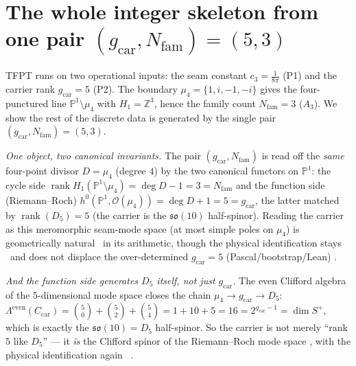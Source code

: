\documentclass[11pt,a4paper]{article}
\newcommand{\cthree}{c_3}
\newcommand{\gcar}{g_{\mathrm{car}}}
\newcommand{\Nfam}{N_{\mathrm{fam}}}
\newcommand{\Z}{\mathbb Z}
\newcommand{\PP}{\mathbb P}
\begin{document}
\section{The whole integer skeleton from one pair $(\gcar,\Nfam)=(5,3)$}\label{sec:core}
TFPT runs on two operational inputs: the seam constant $\cthree=\tfrac1{8\pi}$ (P1) and the carrier rank
$\gcar=5$ (P2). The boundary $\mu_4=\{1,i,-1,-i\}$ gives the four-punctured line $\mathbb P^1\setminus\mu_4$
with $H_1=\Z^3$, hence the family count $\Nfam=3$ ($A_3$). We show the rest of the discrete data is
generated by the single pair $(\gcar,\Nfam)=(5,3)$.
\par\smallskip
\noindent\emph{One object, two canonical invariants.} The pair $(\gcar,\Nfam)$ is read off the
\emph{same} four-point divisor $D=\mu_4$ (degree $4$) by the two canonical functors on $\PP^1$: the cycle
side $\operatorname{rank}H_1(\PP^1\setminus\mu_4)=\deg D-1=3=\Nfam$ and the function side (Riemann--Roch)
$h^0(\PP^1,\mathcal O(\mu_4))=\deg D+1=5=\gcar$, the latter matched by $\operatorname{rank}(D_5)=5$ (the
carrier is the $\mathfrak{so}(10)$ half-spinor). Reading the carrier as this meromorphic seam-mode space
(at most simple poles on $\mu_4$) is geometrically natural \mE\ in its arithmetic, though the physical
identification stays \mC\ and does not displace the over-determined $\gcar=5$ (Pascal/bootstrap/Lean)
.
\par\smallskip
\noindent\emph{And the function side generates $D_5$ itself, not just $\gcar$.} The even Clifford algebra of
the $5$-dimensional mode space closes the chain $\mu_4\to\gcar\to D_5$: $\Lambda^{\mathrm{even}}(C_{\mathrm{car}})
=\binom50+\binom52+\binom54=1+10+5=16=2^{\gcar-1}=\dim S^+$, which is exactly the $\mathfrak{so}(10)=D_5$
half-spinor. So the carrier is not merely ``rank $5$ like $D_5$'' --- it \emph{is} the Clifford spinor of the
Riemann--Roch mode space \mE, with the physical identification again \mC\ .
\end{document}
